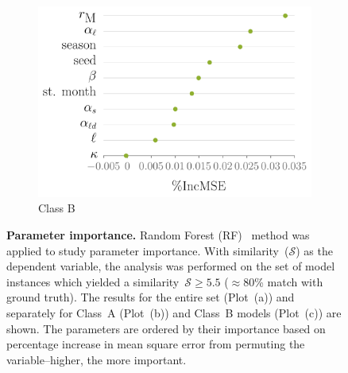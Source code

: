 \documentclass[11pt]{article}
\newcommand{\similarity}{\mathcal{S}}
\newcommand{\mooreRange}{r_\mathrm{M}}
\theoremstyle{definition}
\begin{document}
\begin{figure}[t]
\begin{subfigure}[b]{.32\textwidth}
\includegraphics[width=1.1\textwidth]{../cellular_automata/results/rf/rf_importance_long_mse.pdf}
\caption{Class B\label{fig:rfLong}}
\end{subfigure}
\caption{\textbf{Parameter importance.} Random Forest
(RF)~\cite{breiman2001random} method was applied to study parameter
importance. With similarity~($\similarity$) as the dependent variable, the
analysis was performed on the set of model instances which yielded a
similarity~$\similarity\ge5.5$ ($\approx80$\% match with ground truth). The
results for the entire set (Plot~(a)) and separately for Class~A (Plot~(b))
and Class~B models (Plot~(c)) are shown. The parameters are ordered by
their importance based on percentage increase in mean square error from
permuting the variable--higher, the more important.
\label{fig:sensitivity}}
\end{figure}
\end{document}
